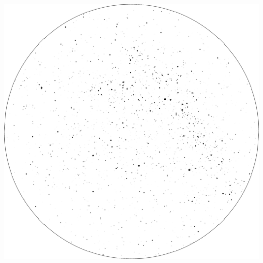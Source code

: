 \documentclass{./SAS-class-skygen}
\begin{document}
	\vspace{0.5cm}
    \begin{center}
    \includegraphics[width=\textwidth]{./pics/skychart55.png}
    \end{center}
    
    
\end{document}

